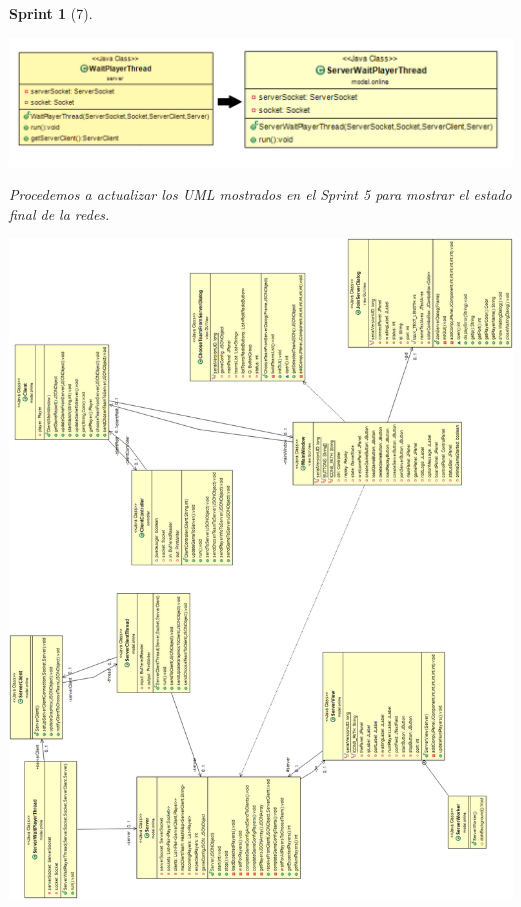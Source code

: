 \documentclass[12pt,a4paper,openright]{book}
\theoremstyle{break}
\newtheorem*{sprint}{Sprint}
\begin{document}
\begin{sprint}[7]
\begin{center}
\includegraphics[scale=0.3]{WaitPlayerThread-evol.png} 
\end{center}

Procedemos a actualizar los UML mostrados en el Sprint 5 para mostrar el estado final de la redes.

\begin{center}
\includegraphics[scale=0.45]{UMLClasesRedSprint7.png} 
\end{center}


\end{sprint}
\end{document}
